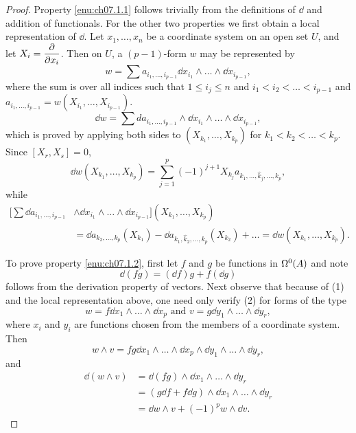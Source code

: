 \documentclass[../main]{subfiles}
\begin{document}
\begin{proof}
Property \ref{enu:ch07.1.1} follows trivially from the definitions of $\dd$ and addition of functionals. For the other two properties we first obtain a local representation of $\dd$. Let $x_1, \ldots, x_n$ be a coordinate system on an open set $U$, and let $X_i = \pdv{}{x_i}$. Then on $U$, a $(p - 1)$-form $w$ may be represented by \[w = \sum a_{i_1, \ldots, i_{p - 1}} \dd x_{i_1} \wedge \ldots \wedge \dd x_{i_{p - 1}},\]where the sum is over all indices such that $1 \le i_j \le n$ and $i_1 < i_2 < \ldots < i_{p - 1}$ and $a_{i_1, \ldots, i_{p - 1}} = w(X_{i_1}, \ldots, X_{i_{p - 1}})$. \[\dd w = \sum d a_{i_1, \ldots, i_{p - 1}} \wedge \dd x_{i_1} \wedge \ldots \wedge \dd x_{i_{p - 1}},\] which is proved by applying both sides to $(X_{k_1}, \ldots, X_{k_p})$ for $k_1 < k_2 < \ldots < k_p$. Since $[X_r, X_s] = 0$, \[\dd w(X_{k_1}, \ldots, X_{k_p}) = \sum_{j = 1}^p (-1)^{j + 1} X_{k_j} a_{k_1, \ldots, \widehat k_j, \ldots, k_p},\] while 
\begin{align*}
    \Big[\sum \dd a_{i_1, \ldots, i_{p - 1}}& \wedge \dd x_{i_1} \wedge \ldots \wedge \dd x_{i_{p - 1}}\Big](X_{k_1}, \ldots, X_{k_p})\\
    &= \dd a_{k_2, \ldots, k_p}(X_{k_1}) - \dd a_{k_1, \widehat k_2, \ldots, k_p}(X_{k_2}) + \ldots= \dd w(X_{k_1}, \ldots, X_{k_p}).
\end{align*}

\par To prove property \ref{enu:ch07.1.2}, first let $f$ and $g$ be functions in $\formbundle{A}{0}$ and note \[\dd(fg) = (\dd f) g + f (\dd g)\] follows from the derivation property of vectors. Next observe that because of (1) and the local representation above, one need only verify (2) for forms of the type \[w = f \dd x_1 \wedge \ldots \wedge \dd x_p\text{ and } v = g \dd y_1 \wedge \ldots \wedge \dd y_r,\] where $x_i$ and $y_i$ are functions chosen from the members of a coordinate system. Then \[w \wedge v = fg \dd x_1 \wedge \ldots \wedge \dd x_p \wedge \dd y_1 \wedge \ldots \wedge \dd y_r,\] and 
\begin{align*}
  \dd (w \wedge v) &= \dd(fg) \wedge \dd x_1 \wedge \ldots \wedge \dd y_r\\ &= (g \dd f + f \dd g) \wedge \dd x_1 \wedge \ldots \wedge \dd y_r\\ &= \dd w \wedge v + (-1)^p w \wedge \dd v.  
\end{align*}



\end{proof}
\end{document}

